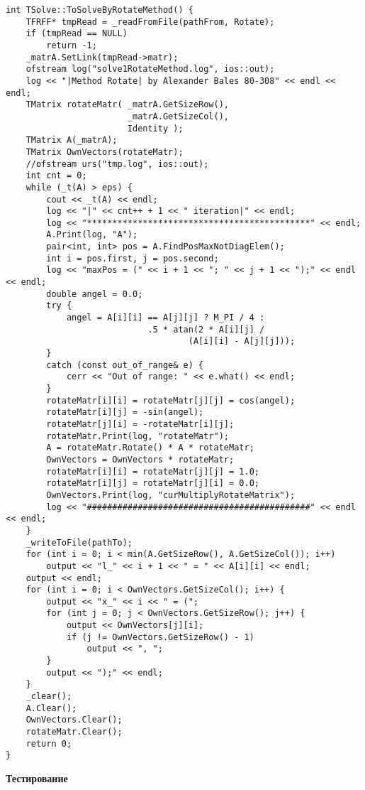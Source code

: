 \begin{lstlisting}
int TSolve::ToSolveByRotateMethod() {
    TFRFF* tmpRead = _readFromFile(pathFrom, Rotate);
    if (tmpRead == NULL)
        return -1;
    _matrA.SetLink(tmpRead->matr);
    ofstream log("solve1RotateMethod.log", ios::out);
    log << "|Method Rotate| by Alexander Bales 80-308" << endl << endl;
    TMatrix rotateMatr( _matrA.GetSizeRow(), 
                        _matrA.GetSizeCol(),
                        Identity );
    TMatrix A(_matrA);
    TMatrix OwnVectors(rotateMatr);
    //ofstream urs("tmp.log", ios::out);
    int cnt = 0;
    while (_t(A) > eps) {
        cout << _t(A) << endl;
        log << "|" << cnt++ + 1 << " iteration|" << endl;
        log << "********************************************" << endl;
        A.Print(log, "A");
        pair<int, int> pos = A.FindPosMaxNotDiagElem();
        int i = pos.first, j = pos.second;
        log << "maxPos = (" << i + 1 << "; " << j + 1 << ");" << endl << endl;
        double angel = 0.0;
        try {
            angel = A[i][i] == A[j][j] ? M_PI / 4 :
                            .5 * atan(2 * A[i][j] /
                                    (A[i][i] - A[j][j]));
        }
        catch (const out_of_range& e) {
            cerr << "Out of range: " << e.what() << endl;
        }
        rotateMatr[i][i] = rotateMatr[j][j] = cos(angel);
        rotateMatr[i][j] = -sin(angel);
        rotateMatr[j][i] = -rotateMatr[i][j];
        rotateMatr.Print(log, "rotateMatr");
        A = rotateMatr.Rotate() * A * rotateMatr;
        OwnVectors = OwnVectors * rotateMatr;
        rotateMatr[i][i] = rotateMatr[j][j] = 1.0;
        rotateMatr[i][j] = rotateMatr[j][i] = 0.0;
        OwnVectors.Print(log, "curMultiplyRotateMatrix");
        log << "############################################" << endl << endl;
    }
    _writeToFile(pathTo);
    for (int i = 0; i < min(A.GetSizeRow(), A.GetSizeCol()); i++)
        output << "l_" << i + 1 << " = " << A[i][i] << endl;
    output << endl;
    for (int i = 0; i < OwnVectors.GetSizeCol(); i++) {
        output << "x_" << i << " = (";
        for (int j = 0; j < OwnVectors.GetSizeRow(); j++) {
            output << OwnVectors[j][i];
            if (j != OwnVectors.GetSizeRow() - 1)
                output << ", ";
        }
        output << ");" << endl;
    }
    _clear();
    A.Clear();
    OwnVectors.Clear();
    rotateMatr.Clear(); 
    return 0;
}
\end{lstlisting}
\vspace{0.5cm}

\textbf{Тестирование}\\

